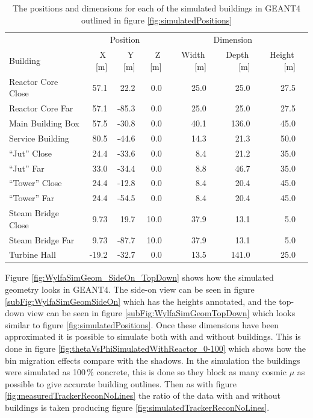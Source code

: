 \begin{table}[!h]
\centering
\begin{tabular}{lrrrrrrr}  
\toprule
\multicolumn{1}{c}{} & \multicolumn{3}{c}{Position} & \multicolumn{3}{c}{Dimension} \\
\cmidrule(r){2-4}
\cmidrule(r){5-7}
Building           & X\,[m] & Y\,[m] & Z\,[m] & Width\,[m] & Depth\,[m] & Height\,[m]\\
\midrule
Reactor Core Close & 57.1   &  22.2  & 0.0     & 25.0       & 25.0       & 27.5\\
Reactor Core Far   & 57.1   & -85.3  & 0.0     & 25.0       & 25.0       & 27.5\\
Main Building Box  & 57.5   & -30.8  & 0.0     & 40.1       & 136.0      & 45.0\\
Service Building   & 80.5   & -44.6  & 0.0     & 14.3       & 21.3       & 50.0\\
“Jut” Close        & 24.4   & -33.6  & 0.0     & 8.4        & 21.2       & 35.0\\
“Jut” Far          & 33.0   & -34.4  & 0.0     & 8.8        & 46.7       & 35.0\\
“Tower” Close      & 24.4   & -12.8  & 0.0     & 8.4        & 20.4       & 45.0\\
“Tower” Far        & 24.4   & -54.5  & 0.0     & 8.4        & 20.4       & 45.0\\
Steam Bridge Close & 9.73   &  19.7  & 10.0    & 37.9       & 13.1       & 5.0\\
Steam Bridge Far   & 9.73   & -87.7  & 10.0    & 37.9       & 13.1       & 5.0\\
Turbine Hall       & -19.2  & -32.7  & 0.0     & 13.5       & 141.0      & 25.0\\
\bottomrule  
\end{tabular}
\caption{The positions and dimensions for each of the simulated buildings in GEANT4 outlined in figure \ref{fig:simulatedPositions} }
\label{tab:simulatedBuildingPositions}
\end{table}

Figure \ref{fig:WylfaSimGeom_SideOn_TopDown} shows how the simulated geometry looks in  GEANT4. The side-on view can be seen in figure \ref{subFig:WylfaSimGeomSideOn} which has the heights annotated, and the top-down view can be seen in figure \ref{subFig:WylfaSimGeomTopDown} which looks similar to figure \ref{fig:simulatedPositions}. Once these dimensions have been approximated it is possible to simulate both with and without buildings. This is done in figure \ref{fig:thetaVsPhiSimulatedWithReactor_0-100} which shows how the bin migration effects compare with the shadows. In the simulation the buildings were simulated as 100\,\% concrete, this is done so they block as many cosmic $\mu$ as possible to give accurate building outlines. Then as with figure  \ref{fig:measuredTrackerReconNoLines} the ratio of the data with and without buildings is taken producing figure \ref{fig:simulatedTrackerReconNoLines}. 

